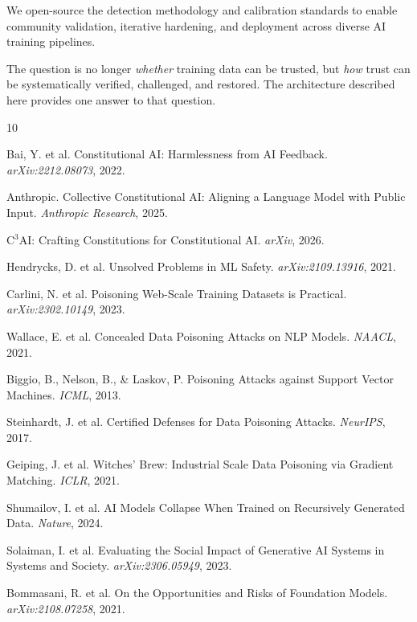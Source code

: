 \documentclass[11pt]{article}
\begin{document}
We open-source the detection methodology and calibration standards to enable community
validation, iterative hardening, and deployment across diverse AI training pipelines.

The question is no longer \textit{whether} training data can be trusted, but \textit{how} 
trust can be systematically verified, challenged, and restored. The architecture described 
here provides one answer to that question.

\begin{thebibliography}{10}

Bai, Y. et al. Constitutional AI: Harmlessness from AI Feedback. \textit{arXiv:2212.08073}, 2022.

Anthropic. Collective Constitutional AI: Aligning a Language Model with Public Input. \textit{Anthropic Research}, 2025.

C$^3$AI: Crafting Constitutions for Constitutional AI. \textit{arXiv}, 2026.

Hendrycks, D. et al. Unsolved Problems in ML Safety. \textit{arXiv:2109.13916}, 2021.

Carlini, N. et al. Poisoning Web-Scale Training Datasets is Practical. \textit{arXiv:2302.10149}, 2023.

Wallace, E. et al. Concealed Data Poisoning Attacks on NLP Models. \textit{NAACL}, 2021.

Biggio, B., Nelson, B., \& Laskov, P. Poisoning Attacks against Support Vector Machines. \textit{ICML}, 2013.

Steinhardt, J. et al. Certified Defenses for Data Poisoning Attacks. \textit{NeurIPS}, 2017.

Geiping, J. et al. Witches' Brew: Industrial Scale Data Poisoning via Gradient Matching. \textit{ICLR}, 2021.

Shumailov, I. et al. AI Models Collapse When Trained on Recursively Generated Data. \textit{Nature}, 2024.

Solaiman, I. et al. Evaluating the Social Impact of Generative AI Systems in Systems and Society. \textit{arXiv:2306.05949}, 2023.

Bommasani, R. et al. On the Opportunities and Risks of Foundation Models. \textit{arXiv:2108.07258}, 2021.


\end{thebibliography}
\end{document}
